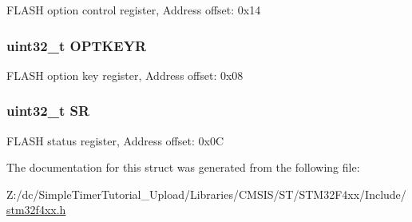 F\-L\-A\-S\-H option control register, Address offset\-: 0x14 \hypertarget{struct_f_l_a_s_h___type_def_afc4900646681dfe1ca43133d376c4423}{
\subsubsection[{O\-P\-T\-K\-E\-Y\-R}]{ uint32\-\_\-t O\-P\-T\-K\-E\-Y\-R}}\label{struct_f_l_a_s_h___type_def_afc4900646681dfe1ca43133d376c4423}
F\-L\-A\-S\-H option key register, Address offset\-: 0x08 \hypertarget{struct_f_l_a_s_h___type_def_af6aca2bbd40c0fb6df7c3aebe224a360}{
\subsubsection[{S\-R}]{ uint32\-\_\-t S\-R}}\label{struct_f_l_a_s_h___type_def_af6aca2bbd40c0fb6df7c3aebe224a360}
F\-L\-A\-S\-H status register, Address offset\-: 0x0\-C 

The documentation for this struct was generated from the following file\-:\begin{DoxyCompactItemize}
\item 
Z\-:/dc/\-Simple\-Timer\-Tutorial\-\_\-\-Upload/\-Libraries/\-C\-M\-S\-I\-S/\-S\-T/\-S\-T\-M32\-F4xx/\-Include/\hyperlink{stm32f4xx_8h}{stm32f4xx.\-h}\end{DoxyCompactItemize}
